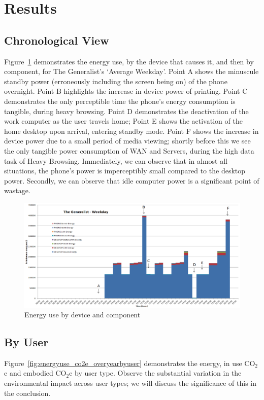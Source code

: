 \documentclass[conference]{IEEEtran}
\begin{document}
\section{Results}

\subsection{Chronological View}

Figure~\ref{fig:generalist_weekday} demonstrates the energy use, by
the device that causes it, and then by component, for The Generalist's
`Average Weekday'. Point A shows the minuscule standby power
(erroneously including the screen being on) of the phone
overnight. Point B highlights the increase in device power of
printing. Point C demonstrates the only perceptible time the phone's
energy consumption is tangible, during heavy browsing. Point D
demonstrates the deactivation of the work computer as the user travels
home; Point E shows the activation of the home desktop upon arrival,
entering standby mode. Point F shows the increase in device power due
to a small period of media viewing; shortly before this we see the
only tangible power consumption of WAN and Servers, during the high
data task of Heavy Browsing. Immediately, we can observe that in
almost all situations, the phone's power is imperceptibly small
compared to the desktop power. Secondly, we can observe that idle
computer power is a significant point of wastage.

\begin{figure}[!htp]
\centering
\includegraphics[width=0.8\columnwidth]{images/generalist_weekday.png}
\caption{Energy use by device and component}
\label{fig:generalist_weekday} 
\end{figure}

\subsection{By User}

Figure~\ref{fig:energyuse_co2e_overyearbyuser} demonstrates the
energy, in use CO$_2$e and embodied CO$_2$e by user type.
Observe the substantial variation in the environmental
impact across user types; we will discuss the significance of this
in the conclusion.
\end{document}
